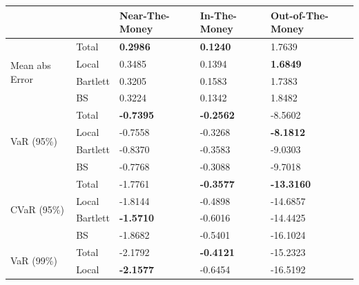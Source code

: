 \documentclass[letterpaper,12pt,titlepage,oneside,final]{book}
\numberwithin{equation}{section}
\theoremstyle{definition}
\begin{document}
\begin{table}[htp!]
	\centering
	\begin{tabular}{ll|l|l|l|}
	\cline{3-5}
														  &          & Near-The-Money   & In-The-Money     & Out-of-The-Money  \\ \hline
	\multicolumn{1}{|l|}{\multirow{4}{*}{Mean abs Error}} & Total    & \textbf{0.2986}  & \textbf{0.1240}  & 1.7639            \\  
	\multicolumn{1}{|l|}{}                                & Local    & 0.3485           & 0.1394           & \textbf{1.6849}   \\  
	\multicolumn{1}{|l|}{}                                & Bartlett & 0.3205           & 0.1583           & 1.7383            \\  
	\multicolumn{1}{|l|}{}                                & BS       & 0.3224           & 0.1342           & 1.8482            \\ \hline
	\multicolumn{1}{|l|}{\multirow{4}{*}{VaR (95\%)}}     & Total    & \textbf{-0.7395} & \textbf{-0.2562} & -8.5602           \\  
	\multicolumn{1}{|l|}{}                                & Local    & -0.7558          & -0.3268          & \textbf{-8.1812}  \\  
	\multicolumn{1}{|l|}{}                                & Bartlett & -0.8370          & -0.3583          & -9.0303           \\  
	\multicolumn{1}{|l|}{}                                & BS       & -0.7768          & -0.3088          & -9.7018           \\ \hline
	\multicolumn{1}{|l|}{\multirow{4}{*}{CVaR (95\%)}}    & Total    & -1.7761          & \textbf{-0.3577} & \textbf{-13.3160} \\  
	\multicolumn{1}{|l|}{}                                & Local    & -1.8144          & -0.4898          & -14.6857          \\  
	\multicolumn{1}{|l|}{}                                & Bartlett & \textbf{-1.5710} & -0.6016          & -14.4425          \\  
	\multicolumn{1}{|l|}{}                                & BS       & -1.8682          & -0.5401          & -16.1024          \\ \hline
	\multicolumn{1}{|l|}{\multirow{4}{*}{VaR (99\%)}}     & Total    & -2.1792          & \textbf{-0.4121} & -15.2323          \\  
	\multicolumn{1}{|l|}{}                                & Local    & \textbf{-2.1577} & -0.6454          & -16.5192          \\  

\end{tabular}
\end{table}
\end{document}
